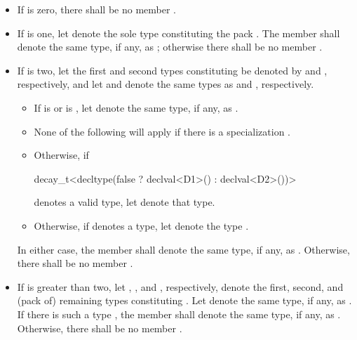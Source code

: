 \begin{itemize}
\item If  is zero, there shall be no member .

\item If  is one, let  denote the sole type
constituting the pack .
The member   shall denote the same
type, if any, as ;
otherwise there shall be no member .

\item If  is two,
let the first and second types constituting  be denoted
by  and , respectively, and
let  and  denote
the same types as  and , respectively.
  \begin{itemize}
  \item If  is  or
      is ,
     let  denote the same type, if any,
     as .
  \item
    \begin{note}
      None of the following will apply if there is a specialization
      .
    \end{note}
  \item Otherwise, if
\begin{codeblock}
decay_t<decltype(false ? declval<D1>() : declval<D2>())>
\end{codeblock}
    denotes a valid type, let  denote that type.
  \item Otherwise, if
    denotes a type, let  denote the type
    .
  \end{itemize}
In either case, the member   shall denote
the same type, if any, as .
Otherwise, there shall be no member .

\item If  is greater than two,
let , , and , respectively,
denote the first, second, and (pack of) remaining types constituting .
Let  denote the same type, if any, as .
If there is such a type , the member  
shall denote the same type, if any, as .
Otherwise, there shall be no member .
\end{itemize}

